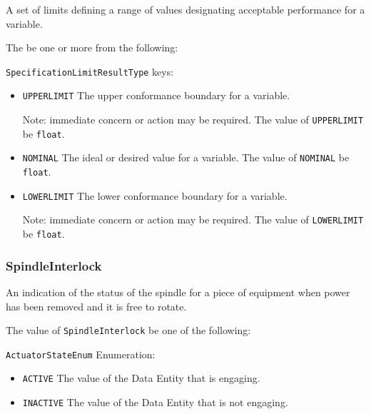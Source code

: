 A set of limits defining a range of values designating acceptable performance for a variable.


The   \MUST be one or more from the following:

\texttt{SpecificationLimitResultType} keys:

\begin{itemize}
\item \texttt{UPPER\textunderscore LIMIT} \newline The upper conformance boundary for a variable.

\newline Note: immediate concern or action may be required. 
\newline The value of \texttt{UPPER\textunderscore LIMIT} \MUST be \texttt{float}.

\item \texttt{NOMINAL} \newline The ideal or desired value for a variable. 
\newline The value of \texttt{NOMINAL} \MUST be \texttt{float}.

\item \texttt{LOWER\textunderscore LIMIT} \newline The lower conformance boundary for a variable.

\newline Note: immediate concern or action may be required. 
\newline The value of \texttt{LOWER\textunderscore LIMIT} \MUST be \texttt{float}.

\end{itemize}



\subsubsection{SpindleInterlock}
\label{sec:SpindleInterlock}



An indication of the status of the spindle for a piece of equipment when power has been removed and it is free to rotate.


The value of \texttt{SpindleInterlock} \MUST be one of the following: 


\texttt{ActuatorStateEnum} Enumeration:

\begin{itemize}
\item \texttt{ACTIVE} \newline The value of the \gls{Data Entity} that is engaging. 
\item \texttt{INACTIVE} \newline The value of the \gls{Data Entity} that is not engaging. 
\end{itemize}



